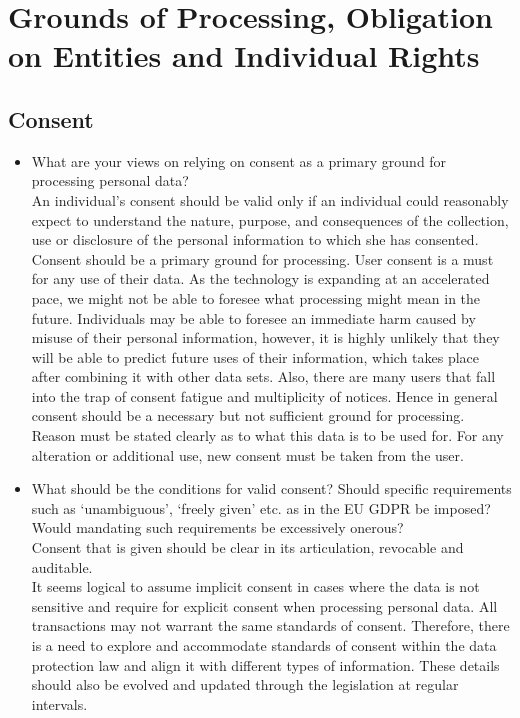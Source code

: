 \section{Grounds of Processing, Obligation on Entities and Individual Rights}
\subsection{Consent}
\begin{itemize}
	\item What are your views on relying on consent as a primary ground for processing personal data?
	\\
	An individual's consent should be valid only if an individual could reasonably expect to understand the nature, purpose, and consequences of the collection, use or disclosure of the personal information to which she has consented.
	\\ 
	Consent should be a primary ground for processing. User consent is a must for any use of their data. As the technology is expanding at an accelerated pace, we might not be able to foresee what processing might mean in the future. Individuals may be able to foresee an immediate harm caused by misuse of their personal information, however, it is highly unlikely that they will be able to predict future uses of their information, which takes place after combining it with other data sets. Also, there are many users that fall into the trap of consent fatigue and multiplicity of notices. Hence in general consent should be a necessary but not sufficient ground for processing. Reason must be stated clearly as to what this data is to be used for. For any alteration or additional use, new consent must be taken from the user.
	\item What should be the conditions for valid consent? Should specific requirements such as ‘unambiguous’,  ‘freely given’ etc. as in the EU GDPR be imposed? Would mandating such requirements be excessively onerous?
	\\
	Consent that is given should be clear in its articulation, revocable and auditable.
	\\
	It seems logical to assume implicit consent in cases where the data is not sensitive and require for explicit consent when processing personal data. All transactions may not warrant the same standards of consent. Therefore, there is a need to explore and accommodate standards of consent within the data protection law and align it with different types of information. These details should also be evolved and updated through the legislation at regular intervals.

\end{itemize}
